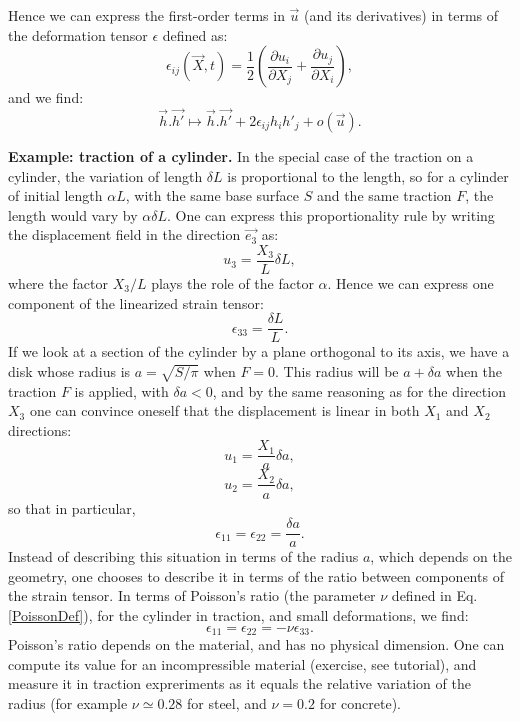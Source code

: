 \documentclass[DIV=12]{article}
\begin{document}
 Hence we can express the first-order terms in $\vec{u}$ (and its derivatives) in terms
  of the deformation tensor $\epsilon$ defined as:
\begin{equation}
\boxed{\epsilon_{ij} (\vec{X},t)= \frac{1}{2}\left(  \frac{\partial u_i}{\partial X_j} + \frac{\partial u_j}{\partial X_i} \right)},
\label{epsilonDef}
\end{equation}
and we find:
\begin{equation}
\boxed{
\vec{h}.\vec{h'} \mapsto  \vec{h}.\vec{h'} + 2\epsilon_{ij} h_i h'_j + o (\vec{u}).
}
\end{equation}

{\bf{Example: traction of a cylinder.}} In the special case of the traction on a cylinder, the variation of length $\delta L$  is proportional 
 to the length, so for a cylinder of initial length $\alpha L$, with the same base  surface $S$ and 
 the same traction $F$, the length would vary by $\alpha \delta L$. One can express
  this proportionality rule by writing the displacement  field in the direction $\vec{e_3}$ as:
\[
u_3 = \frac{X_3}{L} \delta L,
\]
where the factor $X_3/L$ plays the role of the factor $\alpha$.
 Hence we can express one component
 of the linearized strain tensor:
\[
 \epsilon_{33} = \frac{\delta L}{L}.
\]
If we look at a section of the cylinder by a plane orthogonal to its 
 axis, we have a disk whose radius is $a=\sqrt{S/\pi}$ when $F=0$.
 This radius will be $a + \delta a $ when the traction $F$  is applied, 
with $\delta a < 0 $, and by the same reasoning as for the direction 
 $X_3$ one can convince oneself that the displacement 
 is linear in both $X_1$ and $X_2$ directions:
 \[
u_1 = \frac{X_1}{a}  \delta a,
\]
 \[
u_2 = \frac{X_2}{a}  \delta a,
\]
so that in particular,
\[
\epsilon_{11} = \epsilon_{22} = \frac{\delta a}{a}.
\]
Instead of describing this situation in terms of the radius $a$, which depends on the  
 geometry, one chooses to describe it in terms of the ratio between components of the strain tensor.
 In terms of Poisson's ratio (the parameter $\nu$ defined in Eq. \ref{PoissonDef}), for the cylinder in traction,
 and small deformations, we find:
\[
 \epsilon_{11} = \epsilon_{22} = -\nu \epsilon_{33}.
 \label{thinning}
\]
 Poisson's ratio depends on the material, and has no physical dimension. One can compute its value for an incompressible
 material (exercise, see tutorial), and measure it in traction expreriments as it equals the relative variation of the 
 radius (for example $\nu \simeq 0.28$ for steel, and $\nu = 0.2$ for concrete).
\end{document}
